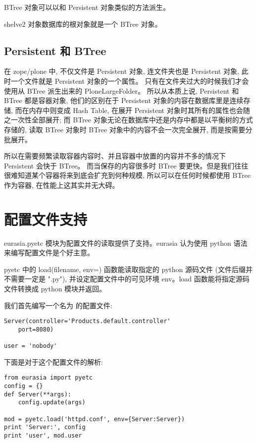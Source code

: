 \documentclass{manual}
\begin{document}
BTree 对象可以以和 Persistent 对象类似的方法派生。

shelve2 对象数据库的根对象就是一个 BTree 对象。 

\subsection{Persistent 和 BTree}

在 zope/plone 中, 不仅文件是 Persistent 对象, 连文件夹也是 Persistent 对象,
此时一个文件就是 Persistent 对象的一个属性。
只有在文件夹过大的时候我们才会使用从 BTree 派生出来的 PloneLargeFolder。
所以从本质上说, Persistent 和 BTree 都是容器对象,
他们的区别在于 Persistent 对象的内容在数据库里是连续存储,
而在内存中则变成 Hash Table, 在展开 Persistent 对象时其所有的属性也会随之一次性全部展开;
而 BTree 对象无论在数据库中还是内存中都是以平衡树的方式存储的,
读取 BTree 对象时 BTree 对象中的内容不会一次完全展开, 而是按需要分批展开。

所以在需要频繁读取容器内容时、并且容器中放置的内容并不多的情况下 Persistent 会快于 BTree。
而当保存的内容很多时 BTree 要更快。但是我们往往很难知道某个容器将来到底会扩充到何种规模,
所以可以在任何时候都使用 BTree 作为容器, 在性能上这其实并无大碍。

\section{配置文件支持}

eurasia.pyetc 模块为配置文件的读取提供了支持。eurasia 认为使用 python 语法来编写配置文件是个好主意。

pyetc 中的 load(filename, env={}) 函数能读取指定的 python 源码文件 (文件后缀并不需要一定是 ".py"), 并设定配置文件中的可见环境 env。load 函数能将指定源码文件转换成 python 模块并返回。

我们首先编写一个名为  的配置文件:

\begin{verbatim}
Server(controller='Products.default.controller'
	port=8080)

user = 'nobody'
\end{verbatim}

下面是对于这个配置文件的解析:

\begin{verbatim}
from eurasia import pyetc
config = {}
def Server(**args):
	config.update(args)

mod = pyetc.load('httpd.conf', env={Server:Server})
print 'Server:', config
print 'user', mod.user
\end{verbatim}
\end{document}
